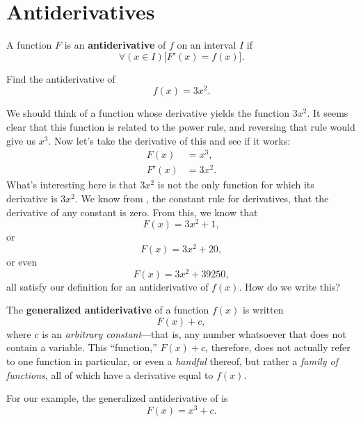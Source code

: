 \section{Antiderivatives}
\begin{defn}
  A function $F$ is an \textbf{antiderivative} of $f$ on an interval $I$ if
  \begin{equation}
      \forall (x \in I) \big[F'(x)=f(x)\big].
  \end{equation}
\end{defn}
\begin{ex}
  Find the antiderivative of
  \begin{equation}
      f(x)=3x^2.
      \label{eq:3x2antiderivative}
  \end{equation}
  \begin{sol}
    We should think of a function whose derivative yields the function $3x^2$.
    It seems clear that this function is related to the power rule, and reversing that rule would give us $x^3$.
    Now let's take the derivative of this and see if it works:
    \begin{align*}
      F(x)&=x^3, \\
      F'(x) &= 3x^2.
    \end{align*}
    What's interesting here is that $3x^2$ is not the only function for which its derivative is $3x^2$.
    We know from , the constant rule for derivatives, that the derivative of any constant is zero.
    From this, we know that
    \[ F(x)=3x^2+1, \]
    or
    \[ F(x)=3x^2+20,\]
    or even
    \[ F(x)=3x^2+39250,\]
    all satisfy our definition for an antiderivative of $f(x)$.
    How do we write this?

    \begin{defn}
        The \textbf{generalized antiderivative} of a function $f(x)$ is written
        \begin{equation}
            F(x)+c,
        \end{equation}
        where $c$ is an \emph{arbitrary constant}---that is, any number whatsoever that does not contain a variable.
        This ``function,'' $F(x)+c$, therefore, does not actually refer to one function in particular,
        or even a \emph{handful} thereof, but rather a \emph{family of functions}, all of which have a derivative equal to $f(x)$.
    \end{defn}

    For our example, the generalized antiderivative of
    is
    \[ F(x)=x^3+c. \]
  \end{sol}
\end{ex}

